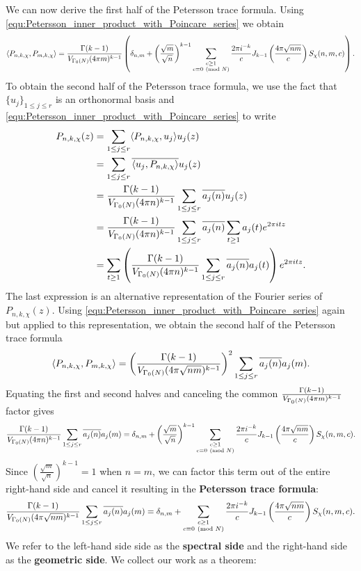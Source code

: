     We can now derive the first half of the Petersson trace formula. Using \cref{equ:Petersson_inner_product_with_Poincare_series} we obtain
    \[
      \langle P_{n,k,\chi},P_{m,k,\chi}\rangle = \frac{\Gamma(k-1)}{V_{\Gamma_{0}(N)}(4\pi m)^{k-1}}\left(\delta_{n,m}+\left(\frac{\sqrt{m}}{\sqrt{n}}\right)^{k-1}\sum_{\substack{c \ge 1 \\ c \equiv 0 \ \left(\text{mod }N\right)}}\frac{2\pi i^{-k}}{c}J_{k-1}\left(\frac{4\pi\sqrt{nm}}{c}\right)S_{\chi}(n,m,c)\right).
    \]
    To obtain the second half of the Petersson trace formula, we use the fact that $\{u_{j}\}_{1 \le j \le r}$ is an orthonormal basis and \cref{equ:Petersson_inner_product_with_Poincare_series} to write
    \begin{align*}
      P_{n,k,\chi}(z) &= \sum_{1 \le j \le r}\langle P_{n,k,\chi},u_{j}\rangle u_{j}(z) \\
      &= \sum_{1 \le j \le r}\overline{\langle u_{j},P_{n,k,\chi}\rangle}u_{j}(z) \\
      &= \frac{\Gamma(k-1)}{V_{\Gamma_{0}(N)}(4\pi n)^{k-1}}\sum_{1 \le j \le r}\overline{a_{j}(n)}u_{j}(z) \\
      &= \frac{\Gamma(k-1)}{V_{\Gamma_{0}(N)}(4\pi n)^{k-1}}\sum_{1 \le j \le r}\overline{a_{j}(n)}\sum_{t \ge 1}a_{j}(t)e^{2\pi itz} \\
      &= \sum_{t \ge 1}\left(\frac{\Gamma(k-1)}{V_{\Gamma_{0}(N)}(4\pi n)^{k-1}}\sum_{1 \le j \le r}\overline{a_{j}(n)}a_{j}(t)\right)e^{2\pi itz}.
    \end{align*}
    The last expression is an alternative representation of the Fourier series of $P_{n,k,\chi}(z)$. Using \cref{equ:Petersson_inner_product_with_Poincare_series} again but applied to this representation, we obtain the second half of the Petersson trace formula
    \[
      \langle P_{n,k,\chi},P_{m,k,\chi}\rangle = \left(\frac{\Gamma(k-1)}{V_{\Gamma_{0}(N)}(4\pi \sqrt{nm})^{k-1}}\right)^{2}\sum_{1 \le j \le r}\overline{a_{j}(n)}a_{j}(m).
    \]
    Equating the first and second halves and canceling the common $\frac{\Gamma(k-1)}{V_{\Gamma_{0}(N)}(4\pi m)^{k-1}}$ factor gives
    \[
      \frac{\Gamma(k-1)}{V_{\Gamma_{0}(N)}(4\pi n)^{k-1}}\sum_{1 \le j \le r}\overline{a_{j}(n)}a_{j}(m) = \delta_{n,m}+\left(\frac{\sqrt{m}}{\sqrt{n}}\right)^{k-1}\sum_{\substack{c \ge 1 \\ c \equiv 0 \ \left(\text{mod }N\right)}}\frac{2\pi i^{-k}}{c}J_{k-1}\left(\frac{4\pi\sqrt{nm}}{c}\right)S_{\chi}(n,m,c).
    \]
    Since $\left(\frac{\sqrt{m}}{\sqrt{n}}\right)^{k-1} = 1$ when $n = m$, we can factor this term out of the entire right-hand side and cancel it resulting in the \textbf{Petersson trace formula}:
    \[
      \frac{\Gamma(k-1)}{V_{\Gamma_{0}(N)}(4\pi\sqrt{nm})^{k-1}}\sum_{1 \le j \le r}\overline{a_{j}(n)}a_{j}(m) = \delta_{n,m}+\sum_{\substack{c \ge 1 \\ c \equiv 0 \ \left(\text{mod }N\right)}}\frac{2\pi i^{-k}}{c}J_{k-1}\left(\frac{4\pi\sqrt{nm}}{c}\right)S_{\chi}(n,m,c).
    \]
    We refer to the left-hand side side as the \textbf{spectral side} and the right-hand side as the \textbf{geometric side}. We collect our work as a theorem:

